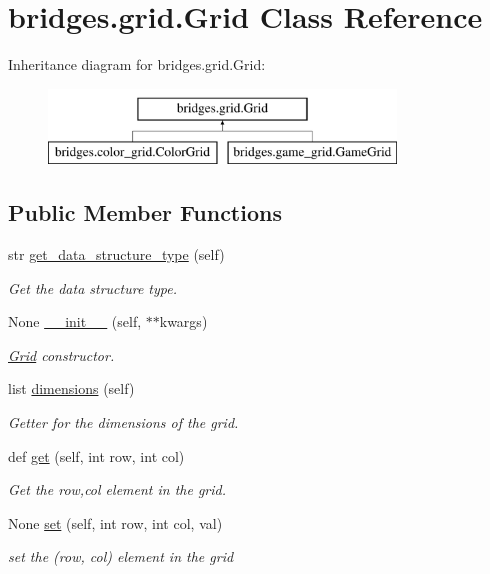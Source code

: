 \hypertarget{classbridges_1_1grid_1_1_grid}{}\section{bridges.\+grid.\+Grid Class Reference}
\label{classbridges_1_1grid_1_1_grid}
Inheritance diagram for bridges.\+grid.\+Grid\+:\begin{figure}[H]
\begin{center}
\leavevmode
\includegraphics[height=2.000000cm]{classbridges_1_1grid_1_1_grid}
\end{center}
\end{figure}
\subsection*{Public Member Functions}
\begin{DoxyCompactItemize}
\item 
str \mbox{\hyperlink{classbridges_1_1grid_1_1_grid_af7a6658d4512112c2888afc6cd946461}{get\+\_\+data\+\_\+structure\+\_\+type}} (self)
\begin{DoxyCompactList}\small\item\em Get the data structure type. \end{DoxyCompactList}\item 
None \mbox{\hyperlink{classbridges_1_1grid_1_1_grid_ac9d0a102e26630422eff7db7e3d893b5}{\+\_\+\+\_\+init\+\_\+\+\_\+}} (self, $\ast$$\ast$kwargs)
\begin{DoxyCompactList}\small\item\em \mbox{\hyperlink{classbridges_1_1grid_1_1_grid}{Grid}} constructor. \end{DoxyCompactList}\item 
list \mbox{\hyperlink{classbridges_1_1grid_1_1_grid_a67078a3d9e8396a2fdfe8dba95156c02}{dimensions}} (self)
\begin{DoxyCompactList}\small\item\em Getter for the dimensions of the grid. \end{DoxyCompactList}\item 
def \mbox{\hyperlink{classbridges_1_1grid_1_1_grid_a11b6e7f13802b381f0a929baf1c7c8e3}{get}} (self, int row, int col)
\begin{DoxyCompactList}\small\item\em Get the row,col element in the grid. \end{DoxyCompactList}\item 
None \mbox{\hyperlink{classbridges_1_1grid_1_1_grid_a85a0300e3326d687e06b50094eb5b5f3}{set}} (self, int row, int col, val)
\begin{DoxyCompactList}\small\item\em set the (row, col) element in the grid \end{DoxyCompactList}\end{DoxyCompactItemize}
